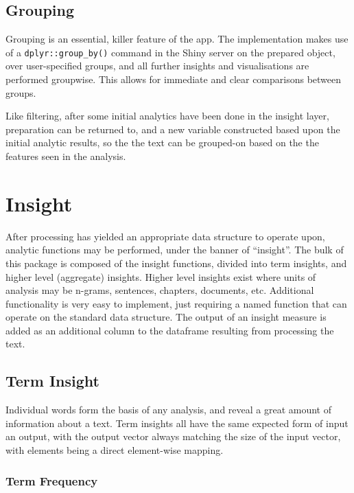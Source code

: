 \documentclass[11pt, a4paper, titlepage]{report}
\begin{document}
\subsection{Grouping}

Grouping is an essential, killer feature of the app. The
implementation makes use of a \texttt{dplyr::group_by()}
command in the Shiny server on the prepared object, over
user-specified groups, and all further insights and visualisations are
performed groupwise. This allows for immediate and clear comparisons
between groups.

Like filtering, after some initial analytics have been done in the
insight layer, preparation can be returned to, and a new variable
constructed based upon the initial analytic results, so the the text
can be grouped-on based on the the features seen in the analysis.

\section{Insight}\label{sec:insight}

After processing has yielded an appropriate data structure to operate
upon, analytic functions may be performed, under the banner of
``insight''. The bulk of this package is composed of the insight
functions, divided into term insights, and higher level (aggregate)
insights. Higher level insights exist where units of analysis may be
n-grams, sentences, chapters, documents, etc. Additional functionality
is very easy to implement, just requiring a named function that can
operate on the standard data structure. The output of an insight
measure is added as an additional column to the dataframe resulting
from processing the text.

\subsection{Term Insight}\label{sec:term-insight}

Individual words form the basis of any analysis, and reveal a great
amount of information about a text. Term insights all have the same
expected form of input an output, with the output vector always
matching the size of the input vector, with elements being a direct
element-wise mapping.

\subsubsection{Term Frequency}\label{sec:term-frequency}
\end{document}
